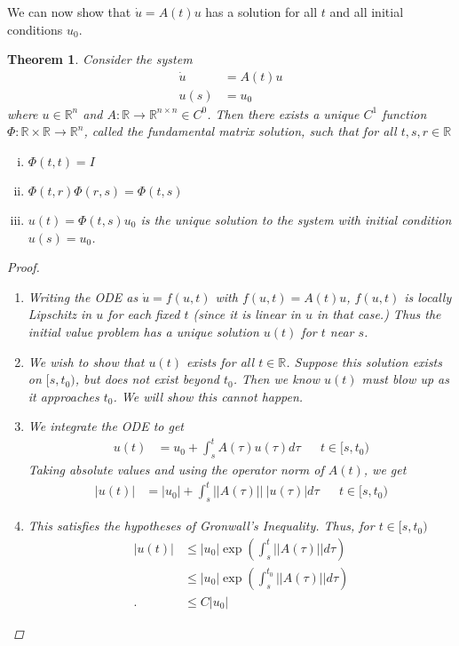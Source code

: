 \documentclass{article}
\newtheorem{theorem}{Theorem}[section]
\def\R{{\mathbb R}}
\begin{document}
We can now show that $\dot{u} = A(t) u$ has a solution for all $t$ and all initial conditions $u_0$.

\begin{theorem}
Consider the system
\begin{align*}
\dot{u} &= A(t) u \\
u(s) &= u_0
\end{align*}
where $u \in \R^n$ and $A:\R \rightarrow \R^{n \times n} \in C^0$. Then there exists a unique $C^1$ function $\Phi: \R \times \R \rightarrow \R^n$, called the \emph{fundamental matrix solution}, such that for all $t, s, r \in \R$
\begin{enumerate}[(i)]
\item $\Phi(t, t) = I$ \\
\item $\Phi(t, r)\Phi(r, s) = \Phi(t,s)$
\item $u(t) = \Phi(t, s)u_0$ is the unique solution to the system with initial condition $u(s) = u_0$.
\end{enumerate}
\begin{proof}
\begin{enumerate}
\item Writing the ODE as $\dot{u} = f(u, t)$ with $f(u,t) = A(t) u$, $f(u, t)$ is locally Lipschitz in $u$ for each fixed $t$ (since it is linear in $u$ in that case.) Thus the initial value problem has a unique solution $u(t)$ for $t$ near $s$. 
\item We wish to show that $u(t)$ exists for all $t \in \R$. Suppose this solution exists on $[s, t_0)$, but does not exist beyond $t_0$. Then we know $u(t)$ must blow up as it approaches $t_0$. We will show this cannot happen.
\item We integrate the ODE to get
\begin{align*}
u(t) &= u_0 + \int_s^t A(\tau)u(\tau)d\tau && t \in [s, t_0)
\end{align*}
Taking absolute values and using the operator norm of $A(t)$, we get
\begin{align*}
|u(t)| &= |u_0| + \int_s^t ||A(\tau)||\:|u(\tau)|d\tau && t \in [s, t_0)
\end{align*}
\item This satisfies the hypotheses of Gronwall's Inequality. Thus, for $t \in [s, t_0)$
\begin{align*}
|u(t)| &\leq |u_0| \exp \left( \int_s^t ||A(\tau)|| d\tau \right) \\
&\leq |u_0| \exp \left( \int_s^{t_0} ||A(\tau)|| d\tau \right) \\.&\leq C |u_0|

\end{align*}
\end{enumerate}
\end{proof}
\end{theorem}
\end{document}
